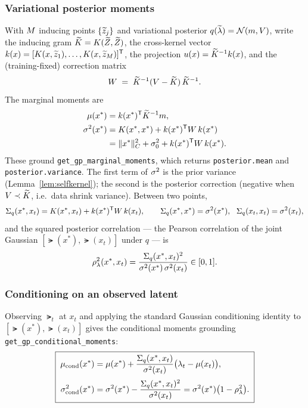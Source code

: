 \subsubsection{Variational posterior moments}
With $M$ inducing points $\{\widetilde{z}_j\}$ and variational posterior
$q(\widetilde{\lambda})=\mathcal{N}(m,V)$, write the inducing gram $\widetilde{K}=K(\widetilde{Z},\widetilde{Z})$, the
cross-kernel vector $k(x)=[K(x,\widetilde{z}_1),\dots,K(x,\widetilde{z}_M)]^{\mathsf{T}}$,
the projection $u(x)=\widetilde{K}^{-1}k(x)$, and the (training-fixed) correction
matrix
\[
  W \;=\; \widetilde{K}^{-1}(V-\widetilde{K})\,\widetilde{K}^{-1}.
\]
The marginal moments are
\begin{equation}\label{eq:margmoments}
\begin{aligned}
  \mu(x^*) &= k(x^*)^{\mathsf{T}}\widetilde{K}^{-1}m,\\
  \sigma^{2}(x^*)  &= K(x^*,x^*)+k(x^*)^{\mathsf{T}} W\,k(x^*)\\
              &= \lVert x^*\rVert_{C}^2+\sigma_{0}^2+k(x^*)^{\mathsf{T}} W\,k(x^*).
\end{aligned}
\end{equation}
These ground \texttt{get\_\allowbreak gp\_\allowbreak marginal\_\allowbreak moments}, which
returns \texttt{posterior.\allowbreak mean} and \texttt{posterior.\allowbreak variance}.
The first term of $\sigma^{2}$ is the prior variance (Lemma~\ref{lem:selfkernel}); the
second is the posterior correction (negative when $V\prec\widetilde{K}$, i.e.\ data
shrink variance). Between two points,
\[
  \Sigma_q(x^*,x_t)=\Kf(x^*,x_t)+\kvec(x^*)\transpose W\,\kvec(x_t),
  \qquad \Sigma_q(x^*,x^*)=\pvar(x^*),\ \ \Sigma_q(x_t,x_t)=\pvar(x_t),
\]
and the squared posterior correlation --- the Pearson correlation of the joint
Gaussian $[\lat(x^*),\lat(x_t)]$ under $q$ --- is
\begin{equation}\label{eq:corrdef}
  \rho_{\lambda}^2(x^*,x_t)=\frac{\Sigma_q(x^*,x_t)^2}{\sigma^{2}(x^*)\,\sigma^{2}(x_t)}\in[0,1].
\end{equation}

\subsubsection{Conditioning on an observed latent}
Observing $\lat_t$ at $x_t$ and applying the standard Gaussian conditioning
identity to $[\lat(x^*),\lat(x_t)]$ gives the conditional moments grounding
\texttt{get\_\allowbreak gp\_\allowbreak conditional\_\allowbreak moments}:
\begin{equation}\label{eq:condmoments}
  \boxed{\;
  \begin{aligned}
  \mu_{\mathrm{cond}}(x^*)&=\mu(x^*)+\frac{\Sigma_q(x^*,x_t)}{\sigma^{2}(x_t)}\bigl(\lambda_t-\mu(x_t)\bigr),\\[2pt]
  \sigma^{2}_{\mathrm{cond}}(x^*)&=\sigma^{2}(x^*)-\frac{\Sigma_q(x^*,x_t)^2}{\sigma^{2}(x_t)}=\sigma^{2}(x^*)\bigl(1-\rho_{\lambda}^2\bigr).
  \end{aligned}
  \;}
\end{equation}


